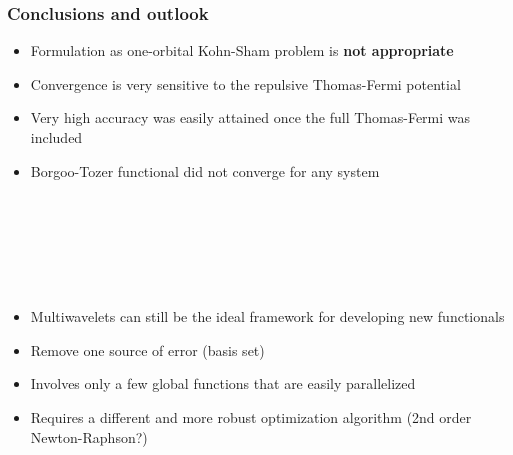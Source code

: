 \documentclass[mathserif, 8pt]{beamer}
\begin{document}
\begin{frame}
    \frametitle{Conclusions and outlook}
    \begin{itemize}
	\item	Formulation as one-orbital Kohn-Sham problem is \textbf{not appropriate}
	\item	Convergence is very sensitive to the repulsive Thomas-Fermi potential
	\item	Very high accuracy was easily attained once the full Thomas-Fermi was included
	\item	Borgoo-Tozer functional did not converge for any system
    \end{itemize}
    \ \\
    \ \\
    \ \\
    \ \\
    \ \\
    \begin{itemize}
	\item	Multiwavelets can still be the ideal framework for developing new functionals
	\item	Remove one source of error (basis set)
	\item	Involves only a few global functions that are easily parallelized 
	\item	Requires a different and more robust optimization algorithm (2nd order Newton-Raphson?)
    \end{itemize}
\end{frame}
\end{document}
